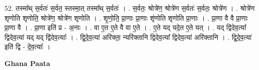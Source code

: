 \documentclass[17pt]{extarticle}
\begin{document}
52. तस्मा᳚थ् स॒र्वतः॑ स॒र्वत॒ स्तस्मा॒त् तस्मा᳚थ् स॒र्वतः॑ । . स॒र्वतः॒ श्रोत्रे॑ण॒ श्रोत्रे॑ण स॒र्वतः॑ स॒र्वतः॒ श्रोत्रे॑ण । . श्रोत्रे॑ण शृणोति शृणोति॒ श्रोत्रे॑ण॒ श्रोत्रे॑ण शृणोति । . शृ॒णो॒ति॒ प्रा॒णाः प्रा॒णाः शृ॑णोति शृणोति प्रा॒णाः । . प्रा॒णा वै वै प्रा॒णाः प्रा॒णा वै । . प्रा॒णा इति॑ प्र - अ॒नाः । . वा ए॒त ए॒ते वै वा ए॒ते । . ए॒ते यद् यदे॒त ए॒ते यत् । . यद् द्वि॑देव॒त्या᳚ द्विदेव॒त्या॑ यद् यद् द्वि॑देव॒त्याः᳚ । . द्वि॒दे॒व॒त्या॑ अरि॑क्ता॒ न्यरि॑क्तानि द्विदेव॒त्या᳚ द्विदेव॒त्या॑ अरि॑क्तानि । . द्वि॒दे॒व॒त्या॑ इति॑ द्वि - दे॒व॒त्याः᳚ । \newline

\textbf{Ghana Paata } \newline
\end{document}
